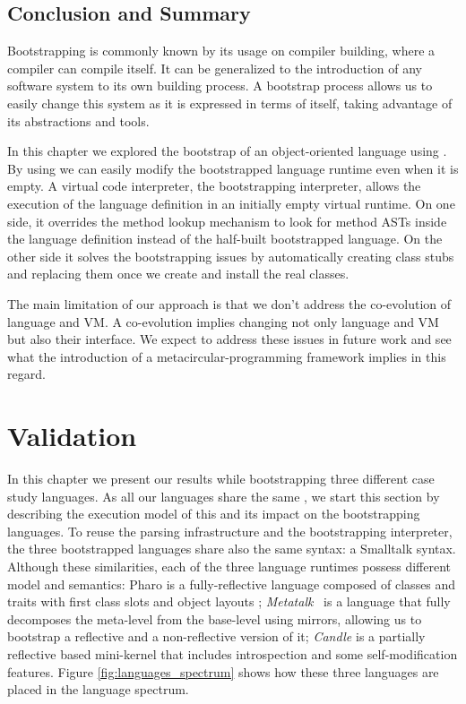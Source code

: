 \section{Conclusion and Summary}

Bootstrapping is commonly known by its usage on compiler building, where a compiler can compile itself.
It can be generalized to the introduction of any software system to its own building process.
A bootstrap process allows us to easily change this system as it is expressed in terms of itself, taking advantage of its abstractions and tools.

In this chapter we explored the bootstrap of an object-oriented language using \Vtt. By using \Vtt we can easily modify the bootstrapped language runtime even when it is empty. A virtual code interpreter, the bootstrapping interpreter, allows the execution of the language definition in an initially empty virtual runtime. On one side, it overrides the method lookup mechanism to look for method ASTs inside the language definition instead of the half-built bootstrapped language. On the other side it solves the bootstrapping issues by automatically creating class stubs and replacing them once we create and install the real classes.

The main limitation of our approach is that we don't address the co-evolution of language and VM. A co-evolution implies changing not only language and VM but also their interface. We expect to address these issues in future work and see what the introduction of a metacircular-programming framework implies in this regard.

\chapter{Validation} \label{sec:bootstrapping_validation}
\introduction

In this chapter we present our results while bootstrapping three different case study languages.
As all our languages share the same \VM, we start this section by describing the execution model of this \VM and its impact on the bootstrapping languages.
To reuse the parsing infrastructure and the bootstrapping interpreter, the three bootstrapped languages share also the same syntax: a Smalltalk syntax. Although these similarities, each of the three language runtimes possess different model and semantics: Pharo is a fully-reflective language composed of classes and traits with first class slots and object layouts \cite{Verw11a}; \emph{Metatalk}~\cite{Papo11a} is a language that fully decomposes the meta-level from the base-level using mirrors, allowing us to bootstrap a reflective and a non-reflective version of it; \emph{Candle} is a partially reflective  based mini-kernel that includes introspection and some self-modification features. Figure \ref{fig:languages_spectrum} shows how these three languages are placed in the language spectrum.%


